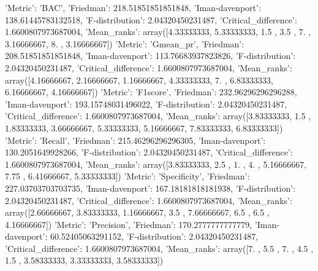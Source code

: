 {'Metric': 'BAC', 'Friedman': 218.51851851851848, 'Iman-davenport': 138.61445783132518, 'F-distribution': 2.04320450231487, 'Critical_difference': 1.6600807973687004, 'Mean_ranks': array([4.33333333, 5.33333333, 1.5       , 3.5       , 7.        ,
       3.16666667, 8.        , 3.16666667])}
{'Metric': 'Gmean_pr', 'Friedman': 208.51851851851848, 'Iman-davenport': 113.76683937823826, 'F-distribution': 2.04320450231487, 'Critical_difference': 1.6600807973687004, 'Mean_ranks': array([4.16666667, 2.16666667, 1.16666667, 4.33333333, 7.        ,
       6.83333333, 6.16666667, 4.16666667])}
{'Metric': 'F1score', 'Friedman': 232.96296296296288, 'Iman-davenport': 193.15748031496022, 'F-distribution': 2.04320450231487, 'Critical_difference': 1.6600807973687004, 'Mean_ranks': array([3.83333333, 1.5       , 1.83333333, 3.66666667, 5.33333333,
       5.16666667, 7.83333333, 6.83333333])}
{'Metric': 'Recall', 'Friedman': 215.46296296296305, 'Iman-davenport': 130.2051649928266, 'F-distribution': 2.04320450231487, 'Critical_difference': 1.6600807973687004, 'Mean_ranks': array([3.83333333, 2.5       , 1.        , 4.        , 5.16666667,
       7.75      , 6.41666667, 5.33333333])}
{'Metric': 'Specificity', 'Friedman': 227.03703703703735, 'Iman-davenport': 167.18181818181938, 'F-distribution': 2.04320450231487, 'Critical_difference': 1.6600807973687004, 'Mean_ranks': array([2.66666667, 3.83333333, 1.16666667, 3.5       , 7.66666667,
       6.5       , 6.5       , 4.16666667])}
{'Metric': 'Precision', 'Friedman': 170.2777777777779, 'Iman-davenport': 60.52405063291152, 'F-distribution': 2.04320450231487, 'Critical_difference': 1.6600807973687004, 'Mean_ranks': array([7.        , 5.5       , 7.        , 4.5       , 1.5       ,
       3.58333333, 3.33333333, 3.58333333])}
